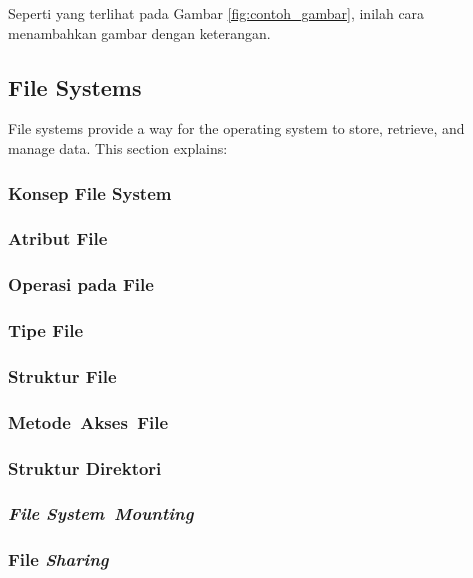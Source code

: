 \documentclass[12pt]{article}
\begin{document}
\begin{itemiz;[e}
Seperti yang terlihat pada Gambar \ref{fig:contoh_gambar}, inilah cara menambahkan gambar dengan keterangan.

\subsection{File Systems}
File systems provide a way for the operating system to store, retrieve, and manage data. This section explains:
\subsubsection{Konsep File System}
\subsubsection{Atribut File}
\subsubsection{Operasi pada File}
\subsubsection{Tipe File}
\subsubsection{Struktur File}
\subsubsection{Metode Akses File}
\subsubsection{Struktur Direktori}
\subsubsection{\textit{File System Mounting}}
\subsubsection{File \textit{Sharing}}

\end{itemiz;[e}
\end{document}
